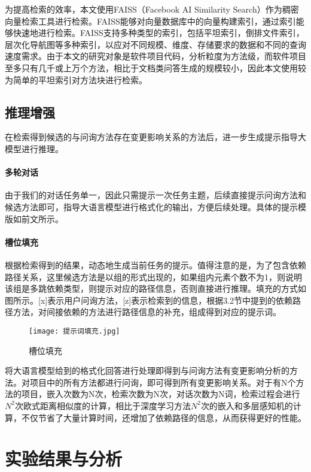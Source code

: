 为提高检索的效率，本文使用FAISS（Facebook AI Similarity Search）作为稠密向量检索工具进行检索。FAISS能够对向量数据库中的向量构建索引，通过索引能够快速地进行检索。FAISS支持多种类型的索引，包括平坦索引，倒排文件索引，层次化导航图等多种索引，以应对不同规模、维度、存储要求的数据和不同的查询速度需求。由于本文的研究对象是软件项目代码，分析粒度为方法级，而软件项目至多只有几千或上万个方法，相比于文档类问答生成的规模较小，因此本文使用较为简单的平坦索引对方法块进行检索。


\subsection{推理增强}

在检索得到候选的与问询方法存在变更影响关系的方法后，进一步生成提示指导大模型进行推理。


\paragraph{多轮对话} 由于我们的对话任务单一，因此只需提示一次任务主题，后续直接提示问询方法和候选方法即可，指导大语言模型进行格式化的输出，方便后续处理。具体的提示模版如前文所示。


\paragraph{槽位填充} 根据检索得到的结果，动态地生成当前任务的提示。值得注意的是，为了包含依赖路径关系，这里候选方法是以组的形式出现的，如果组内元素个数不为1，则说明该组是多跳依赖类型，则提示对应的路径信息，否则直接进行推理。填充的方式如图所示。[x]表示用户问询方法，[z]表示检索到的信息，根据3.2节中提到的依赖路径方法，对间接依赖的方法进行路径信息的补充，组成得到对应的提示词。

\begin{figure}[h]
\centering
\texttt{[image: 提示词填充.jpg]}
\caption{槽位填充}
\end{figure}

将大语言模型给到的格式化回答进行处理即得到与问询方法有变更影响分析的方法。对项目中的所有方法都进行问询，即可得到所有变更影响关系。对于有N个方法的项目，嵌入次数为N次，检索次数为N次，对话次数为N词，检索过程会进行 $N^2$次欧式距离相似度的计算，相比于深度学习方法$N^2$次的嵌入和多层感知机的计算，不仅节省了大量计算时间，还增加了依赖路径的信息，从而获得更好的性能。


\section{实验结果与分析}

